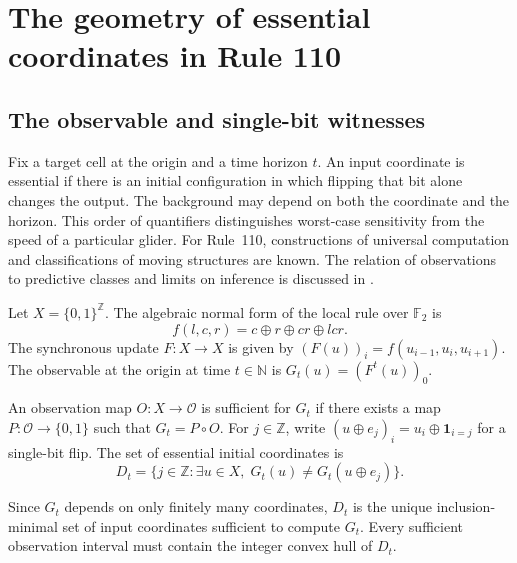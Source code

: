 \section{The geometry of essential coordinates in Rule 110}\label{sec:geometry}
\subsection{The observable and single-bit witnesses}
Fix a target cell at the origin and a time horizon $t$. An input coordinate is essential if there is an initial configuration in which flipping that bit alone changes the output. The background may depend on both the coordinate and the horizon. This order of quantifiers distinguishes worst-case sensitivity from the speed of a particular glider. For Rule~110, constructions of universal computation \cite{cook2004} and classifications of moving structures \cite{wolfram1986,martinez2006} are known. The relation of observations to predictive classes and limits on inference is discussed in \cite{shalizi2001,wolpert2008}.

\begin{definition}
Let $X = \{0, 1\}^{\mathbb{Z}}$. The algebraic normal form of the local rule over $\mathbb{F}_2$ is
\begin{equation}\label{eq:rule110}
f(l, c, r) = c \oplus r \oplus cr \oplus lcr.
\end{equation}
The synchronous update $F : X \to X$ is given by $(F(u))_i = f(u_{i-1}, u_i, u_{i+1})$. The observable at the origin at time $t \in \mathbb{N}$ is $G_t(u) = (F^t(u))_0$.
\end{definition}

\begin{definition}
An observation map $O : X \to \mathcal{O}$ is sufficient for $G_t$ if there exists a map $P : \mathcal{O} \to \{0, 1\}$ such that $G_t = P \circ O$. For $j \in \mathbb{Z}$, write $(u \oplus e_j)_i = u_i \oplus \mathbf{1}_{i=j}$ for a single-bit flip. The set of essential initial coordinates is
\begin{equation}\label{eq:essential_set}
D_t = \{ j \in \mathbb{Z} : \exists u \in X,\; G_t(u) \ne G_t(u \oplus e_j) \}.
\end{equation}
\end{definition}

Since $G_t$ depends on only finitely many coordinates, $D_t$ is the unique inclusion-minimal set of input coordinates sufficient to compute $G_t$. Every sufficient observation interval must contain the integer convex hull of $D_t$.

